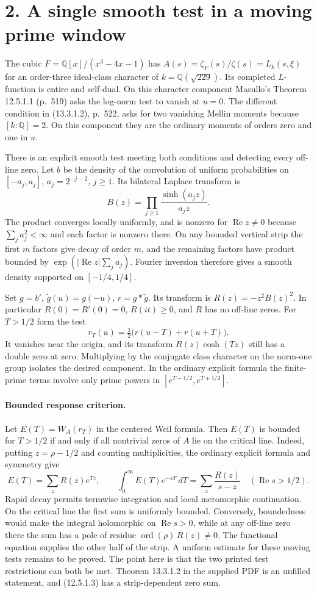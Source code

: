 \documentclass[11pt]{article}
\newcommand{\Rea}{\operatorname{Re}}
\begin{document}
\newpage
\section*{2. A single smooth test in a moving prime window}
The cubic $F=\mathbb Q[x]/(x^3-4x-1)$ has
$A(s)=\zeta_F(s)/\zeta(s)=L_k(s,\xi)$ for an order-three ideal-class
character of $k=\mathbb Q(\sqrt{229})$. Its completed $L$-function is
entire and self-dual. On this character component Masullo's
Theorem 12.5.1.1 (p.~519) asks the log-norm test to vanish at $u=0$.
The different condition in (13.3.1.2), p.~522, asks for two vanishing
Mellin moments because $[k:\mathbb Q]=2$. On this component they are
the ordinary moments of orders zero and one in $u$.

There is an explicit smooth test meeting both conditions and detecting
every off-line zero. Let $b$ be the density of the convolution of
uniform probabilities on $[-a_j,a_j]$, $a_j=2^{-j-2}$, $j\ge1$.
Its bilateral Laplace transform is
\[
 B(z)=\prod_{j\ge1}\frac{\sinh(a_jz)}{a_jz}.
\]
The product converges locally uniformly, and is nonzero for $\Rea z\ne0$
because $\sum_j a_j^2<\infty$ and each factor is nonzero there.
On any bounded vertical strip the first $m$ factors give decay of order
$m$, and the remaining factors have product bounded by
$\exp(|\Rea z|\sum_j a_j)$. Fourier inversion therefore gives a smooth
density supported on $[-1/4,1/4]$.

Set $g=b'$, $\widetilde g(u)=g(-u)$, $r=g*\widetilde g$. Its transform
is $R(z)=-z^2 B(z)^2$. In particular $R(0)=R'(0)=0$, $R(it)\ge0$,
and $R$ has no off-line zeros. For $T>1/2$ form the test
\[
 r_T(u)=\tfrac12\big(r(u-T)+r(u+T)\big).
\]
It vanishes near the origin, and its transform $R(z)\cosh(Tz)$ still
has a double zero at zero. Multiplying by the conjugate class character
on the norm-one group isolates the desired component. In the ordinary
explicit formula the finite-prime terms involve only prime powers in
$[e^{T-1/2},e^{T+1/2}]$.

\paragraph{Bounded response criterion.}
Let $E(T)=W_A(r_T)$ in the centered Weil formula. Then $E(T)$ is bounded
for $T>1/2$ if and only if all nontrivial zeros of $A$ lie on the
critical line. Indeed, putting $z=\rho-1/2$ and counting multiplicities,
the ordinary explicit formula and symmetry give
\[
 E(T)=\sum_z R(z)e^{Tz},\qquad
 \int_0^\infty E(T)e^{-sT}\,dT=\sum_z\frac{R(z)}{s-z}
 \quad(\Rea s>1/2).
\]
Rapid decay permits termwise integration and local meromorphic continuation.
On the critical line the first sum is uniformly bounded. Conversely,
boundedness would make the integral holomorphic on $\Rea s>0$, while
at any off-line zero there the sum has a pole of residue
$\operatorname{ord}(\rho)\,R(z)\ne0$. The functional equation supplies
the other half of the strip. A uniform estimate for these moving tests
remains to be proved. The point here is that the two printed test
restrictions can both be met. Theorem 13.3.1.2 in the supplied PDF is
an unfilled statement, and (12.5.1.3) has a strip-dependent zero sum.
\end{document}

